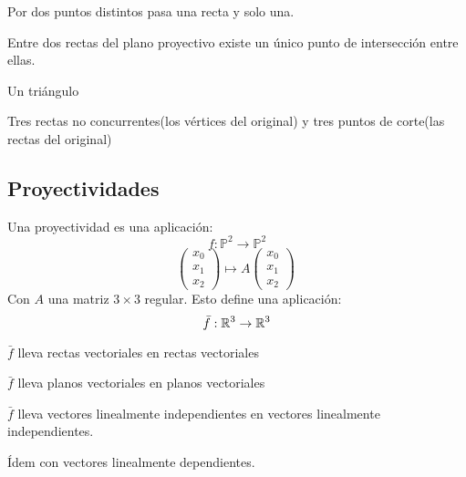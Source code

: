 \begin{nth}
	Por dos puntos distintos pasa una recta y solo una.
\end{nth}

\begin{nth}
	Entre dos rectas del plano proyectivo existe un único punto de intersección entre ellas.
\end{nth}

\begin{ejemplo}
	Un triángulo
\end{ejemplo}
\begin{ndef}
	Tres rectas no concurrentes(los vértices del original) y tres puntos de corte(las rectas del original)
\end{ndef}

\subsection{Proyectividades}

\begin{ndef}[Proyectividad]
	Una proyectividad es una aplicación:
	\[
	f: \mathbb P ^2 \to \mathbb P^2
	\]
	\[
	 \begin{pmatrix}
 x_0\\
 x_1\\
 x_2
\end{pmatrix}  \mapsto A  \begin{pmatrix}
 x_0\\
 x_1\\
 x_2
\end{pmatrix}  \
	\]
	Con $A$ una matriz $3\times 3$ regular. Esto define una aplicación:
	\[
	\bar{f} : \mathbb{R}^3 \to \mathbb{R}^3
	\]

\end{ndef}

\begin{nprop}[Propiedades de $\bar{f}$]\hfill
	\begin{nlist}
	\item $\bar{f}$ lleva rectas vectoriales en rectas vectoriales
	\item $\bar{f}$ lleva planos vectoriales en planos vectoriales
	\item $\bar{f}$ lleva vectores linealmente independientes en vectores linealmente independientes.
	\item Ídem con vectores linealmente dependientes.
\end{nlist}
\end{nprop}


